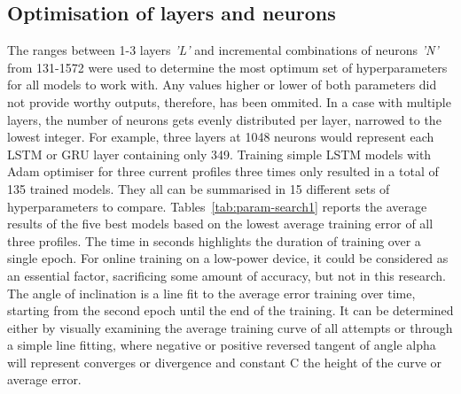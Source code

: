 %
%

\subsection{Optimisation of layers and neurons}
%
The ranges between 1-3 layers \textit{'L'} and incremental combinations of neurons \textit{'N'} from 131-1572 were used to determine the most optimum set of hyperparameters for all models to work with.
Any values higher or lower of both parameters did not provide worthy outputs, therefore, has been ommited.
In a case with multiple layers, the number of neurons gets evenly distributed per layer, narrowed to the lowest integer.
For example, three layers at 1048 neurons would represent each LSTM or GRU layer containing only 349.
Training simple LSTM models with Adam optimiser for three current profiles three times only resulted in a total of 135 trained models.
They all can be summarised in 15 different sets of hyperparameters to compare.
\mbox{Tables~\ref{tab:param-search1}} reports the average results of the five best models based on the lowest average training error of all three profiles.
The time in seconds highlights the duration of training over a single epoch.
For online training on a low-power device, it could be considered as an essential factor, sacrificing some amount of accuracy, but not in this research.
The angle of inclination is a line fit to the average error training over time, starting from the second epoch until the end of the training.
It can be determined either by visually examining the average training curve of all attempts or through a simple line fitting, where negative or positive reversed tangent of angle alpha will represent converges or divergence and constant C the height of the curve or average error.
